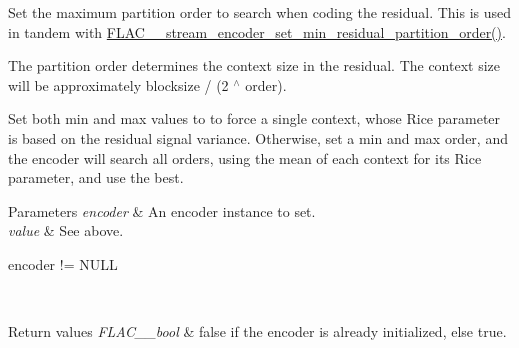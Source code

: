 Set the maximum partition order to search when coding the residual. This is used in tandem with \hyperlink{group__flac__stream__encoder_gae3e2dd204f276d051bf1a118383bfda2}{F\+L\+A\+C\+\_\+\+\_\+stream\+\_\+encoder\+\_\+set\+\_\+min\+\_\+residual\+\_\+partition\+\_\+order()}.

The partition order determines the context size in the residual. The context size will be approximately {\ttfamily blocksize / (2 $^\wedge$ order)}.

Set both min and max values to {} to force a single context, whose Rice parameter is based on the residual signal variance. Otherwise, set a min and max order, and the encoder will search all orders, using the mean of each context for its Rice parameter, and use the best.

{} 
\begin{DoxyParams}{Parameters}
{\em encoder} & An encoder instance to set. \\
\hline
{\em value} & See above.  
\begin{DoxyCode}
encoder != NULL 
\end{DoxyCode}
 \\
\hline
\end{DoxyParams}

\begin{DoxyRetVals}{Return values}
{\em F\+L\+A\+C\+\_\+\+\_\+bool} & {\ttfamily false} if the encoder is already initialized, else {\ttfamily true}. \\
\hline
\end{DoxyRetVals}
\mbox{\label{group__flac__stream__encoder_ga67b30b1a67a9274f7708a22154b225f6}} 
